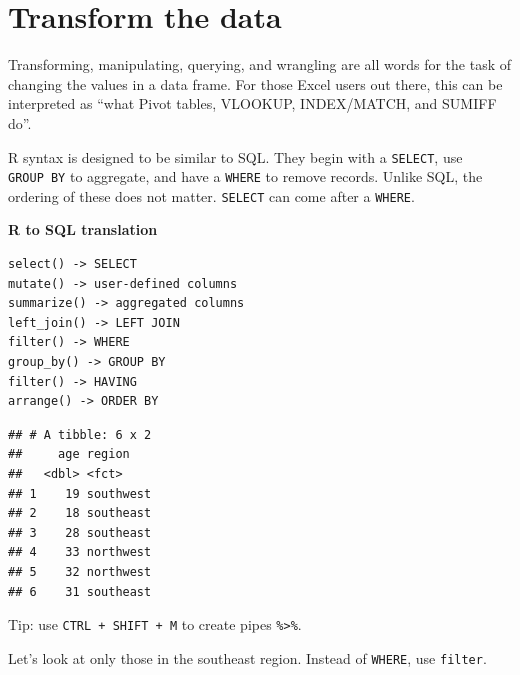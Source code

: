 \documentclass[]{book}
\newenvironment{Shaded}{\begin{snugshade}}{\end{snugshade}}
\newcommand{\KeywordTok}[1]{\textcolor[rgb]{0.13,0.29,0.53}{\textbf{#1}}}
\newcommand{\NormalTok}[1]{#1}
\newcommand{\OperatorTok}[1]{\textcolor[rgb]{0.81,0.36,0.00}{\textbf{#1}}}
\newcommand{\StringTok}[1]{\textcolor[rgb]{0.31,0.60,0.02}{#1}}
\begin{document}
\hypertarget{transform-the-data}{%
\section{Transform the data}\label{transform-the-data}}

Transforming, manipulating, querying, and wrangling are all words for the task of changing the values in a data frame. For those Excel users out there, this can be interpreted as ``what Pivot tables, VLOOKUP, INDEX/MATCH, and SUMIFF do''.

R syntax is designed to be similar to SQL. They begin with a \texttt{SELECT}, use \texttt{GROUP\ BY} to aggregate, and have a \texttt{WHERE} to remove records. Unlike SQL, the ordering of these does not matter. \texttt{SELECT} can come after a \texttt{WHERE}.

\textbf{R to SQL translation}

\begin{verbatim}
select() -> SELECT
mutate() -> user-defined columns
summarize() -> aggregated columns
left_join() -> LEFT JOIN
filter() -> WHERE
group_by() -> GROUP BY
filter() -> HAVING
arrange() -> ORDER BY
\end{verbatim}

\begin{Shaded}
\end{Shaded}

\begin{verbatim}
## # A tibble: 6 x 2
##     age region   
##   <dbl> <fct>    
## 1    19 southwest
## 2    18 southeast
## 3    28 southeast
## 4    33 northwest
## 5    32 northwest
## 6    31 southeast
\end{verbatim}

Tip: use \texttt{CTRL\ +\ SHIFT\ +\ M} to create pipes \texttt{\%\textgreater{}\%}.

Let's look at only those in the southeast region. Instead of \texttt{WHERE}, use \texttt{filter}.

\begin{Shaded}
\end{Shaded}
\end{document}
